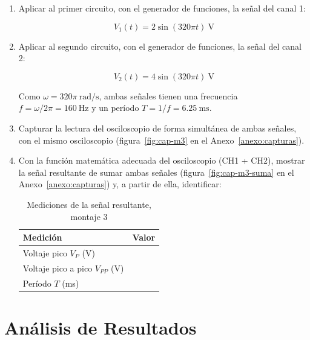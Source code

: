 \documentclass{article}
\newcommand{\vacio}[1][2cm]{\underline{\hspace{#1}}}
\begin{document}
    \begin{enumerate}
        \item Aplicar al primer circuito, con el generador de funciones, la señal del canal 1:

        \[
            V_1(t) = 2\sin(320\pi t)\ \si{\volt}
        \]

        \item Aplicar al segundo circuito, con el generador de funciones, la señal del canal 2:

        \[
            V_2(t) = 4\sin(320\pi t)\ \si{\volt}
        \]

        Como $\omega = 320\pi\ \si{\radian\per\second}$, ambas señales tienen una frecuencia $f = \omega/2\pi = \SI{160}{\hertz}$ y un período $T = 1/f = \SI{6.25}{\milli\second}$.

        \item Capturar la lectura del osciloscopio de forma simultánea de ambas señales, con el mismo osciloscopio (figura~\ref{fig:cap-m3} en el Anexo~\ref{anexo:capturas}).

        \item Con la función matemática adecuada del osciloscopio (CH1 + CH2), mostrar la señal resultante de sumar ambas señales (figura~\ref{fig:cap-m3-suma} en el Anexo~\ref{anexo:capturas}) y, a partir de ella, identificar:

        \begin{table}[ht!]
            \centering
            \begin{tabular}{lc}
                \toprule
                Medición                         & Valor  \\
                \midrule
                Voltaje pico $V_P$ (V)           & \vacio \\
                Voltaje pico a pico $V_{PP}$ (V) & \vacio \\
                Período $T$ (ms)                 & \vacio \\
                \bottomrule
            \end{tabular}
            \caption{Mediciones de la señal resultante, montaje 3}\label{tab:osc-m3}
        \end{table}
    \end{enumerate}

    \section{Análisis de Resultados}
\end{document}
